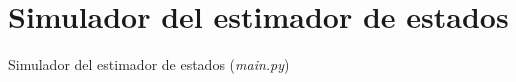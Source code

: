 \chapter{Simulador del estimador de estados}


\begin{codigo}{Simulador del estimador de estados  (\textit{main.py})}
\inputminted{python}{apendices/main.py}
\end{codigo} 
